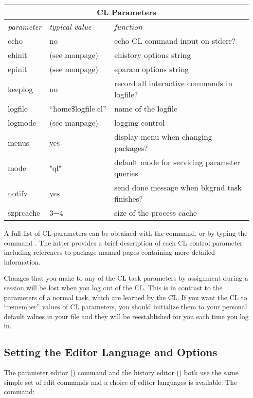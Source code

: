 \begin{center}
\begin{tabular}{|l|l|l|}
\hline
\multicolumn{3}{|c|}{\bf CL Parameters}\\
\hline
{\it parameter} & {\it typical value} & {\it function}\\
\hline
echo	& no		& echo CL command input on stderr? \\
ehinit	& (see manpage)	& ehistory options string \\
epinit	& (see manpage)	& eparam options string \\
keeplog	& no		& record all interactive commands in logfile? \\
logfile	& ``home\$logfile.cl''	& name of the logfile \\
logmode	& (see manpage)	& logging control \\
menus	& yes		& display menu when changing packages? \\
mode	& "ql"		& default mode for servicing parameter queries \\
notify	& yes		& send done message when bkgrnd task finishes? \\
szprcache & 3$-$4	& size of the process cache \\
\hline
\end{tabular}
\end{center}
\medskip

\noindent
A full list of CL parameters can be obtained with the 
command, or by typing the command .  The latter
provides a brief description of each CL control parameter including references
to  package manual pages containing more detailed
information.

Changes that you make to any of the CL task parameters by assignment during
a session will be lost when you log out of the CL.
This is in contrast to the parameters of a normal task, which are learned
by the CL. If you want the CL to ``remember'' values of CL parameters,
you should initialize them to your personal default values in your
 file and they will be reestablished for you each time
you log in.

\subsection{Setting the Editor Language and Options}

\ppind
The parameter editor () command and the history
editor () both use the same simple set of edit commands
and a choice of editor languages is available.  The command:

